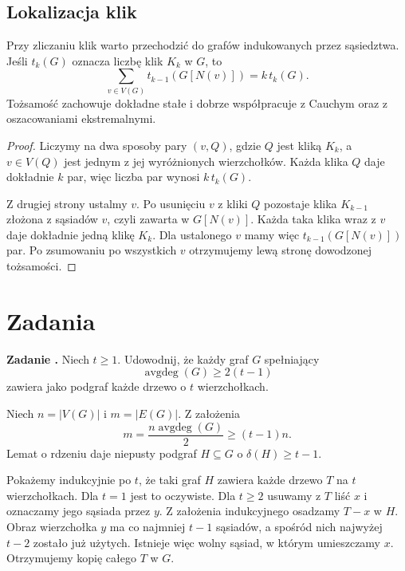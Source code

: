 \documentclass{lecture-kuznia}
\newenvironment{theoryproof}{\begin{proof}}{\end{proof}}
\newcounter{zadanie}
\newenvironment{zadanie}[1]{%
	\refstepcounter{zadanie}%
	\par\medskip\noindent
	\textbf{Zadanie \thezadanie.}\quad
}{\par\medskip}
\begin{document}
\subsection{Lokalizacja klik}

Przy zliczaniu klik warto przechodzić do grafów indukowanych przez
sąsiedztwa. Jeśli $t_k(G)$ oznacza liczbę klik $K_k$ w $G$, to
\[
	\sum_{v\in V(G)}t_{k-1}(G[N(v)])=k\,t_k(G).
\]
Tożsamość zachowuje dokładne stałe i dobrze współpracuje z Cauchym oraz z
oszacowaniami ekstremalnymi.

\begin{theoryproof}
	Liczymy na dwa sposoby pary $(v,Q)$, gdzie $Q$ jest kliką $K_k$, a
	$v\in V(Q)$ jest jednym z jej wyróżnionych wierzchołków. Każda klika $Q$
	daje dokładnie $k$ par, więc liczba par wynosi $k\,t_k(G)$.

	Z drugiej strony ustalmy $v$. Po usunięciu $v$ z kliki $Q$ pozostaje klika
	$K_{k-1}$ złożona z sąsiadów $v$, czyli zawarta w $G[N(v)]$. Każda taka
	klika wraz z $v$ daje dokładnie jedną klikę $K_k$. Dla ustalonego $v$ mamy
	więc $t_{k-1}(G[N(v)])$ par. Po zsumowaniu po wszystkich $v$ otrzymujemy
	lewą stronę dowodzonej tożsamości.
\end{theoryproof}

\newpage
\section{Zadania}

\begin{zadanie}{łatwe} %
	Niech $t\geqslant1$. Udowodnij, że każdy graf $G$ spełniający
	\[
		\operatorname{avgdeg}(G)\geqslant2(t-1)
	\]
	zawiera jako podgraf każde drzewo o $t$ wierzchołkach.
\end{zadanie}

\begin{solutionbox}
	Niech $n=|V(G)|$ i $m=|E(G)|$. Z założenia
	\[
		m=\frac{n\operatorname{avgdeg}(G)}2\geqslant(t-1)n.
	\]
	Lemat o rdzeniu daje niepusty podgraf $H\subseteq G$ o
	$\delta(H)\geqslant t-1$.

	Pokażemy indukcyjnie po $t$, że taki graf $H$ zawiera każde drzewo $T$ na
	$t$ wierzchołkach. Dla $t=1$ jest to oczywiste. Dla $t\geqslant2$ usuwamy
	z $T$ liść $x$ i oznaczamy jego sąsiada przez $y$. Z założenia indukcyjnego
	osadzamy $T-x$ w $H$. Obraz wierzchołka $y$ ma co najmniej $t-1$ sąsiadów,
	a spośród nich najwyżej $t-2$ zostało już użytych. Istnieje więc wolny
	sąsiad, w którym umieszczamy $x$. Otrzymujemy kopię całego $T$ w $G$.
\end{solutionbox}
\end{document}
